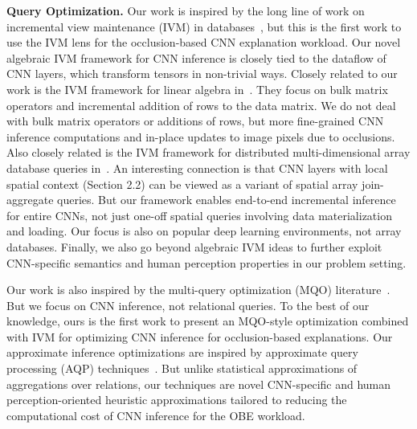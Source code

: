 \documentclass[10pt, sigconf]{acmart}
\begin{document}
\vspace{2mm}
\noindent \textbf{Query Optimization.}
Our work is inspired by the long line of work on incremental view maintenance (IVM) in databases~\cite{chirkova2012materialized, gupta1995maintenance, levy1995answering}, but this is the first work to use the IVM lens for the occlusion-based CNN explanation workload. Our novel algebraic IVM framework for CNN inference is closely tied to the dataflow of CNN layers, which transform tensors in non-trivial ways. Closely related to our work is the IVM framework for linear algebra in~\cite{nikolic2014linview}. They focus on bulk matrix operators and incremental addition of rows to the data matrix. We do not deal with bulk matrix operators or additions of rows, but more fine-grained CNN inference computations and in-place updates to image pixels due to occlusions. Also closely related is the IVM framework for distributed multi-dimensional array database queries in~\cite{zhao2017incremental}. An interesting connection is that CNN layers with local spatial context (Section 2.2) can be viewed as a variant of spatial array join-aggregate queries. But our framework enables end-to-end incremental inference for entire CNNs, not just one-off spatial queries involving data materialization and loading. Our focus is also on popular deep learning environments, not array databases. Finally, we also go beyond algebraic IVM ideas to further exploit CNN-specific semantics and human perception properties in our problem setting.

Our work is also inspired by the multi-query optimization (MQO) literature~\cite{sellis1988multiple,le2012scalable}. But we focus on CNN inference, not relational queries. To the best of our knowledge, ours is the first work to present an MQO-style optimization combined with IVM for optimizing CNN inference for occlusion-based explanations.
Our approximate inference optimizations are inspired by approximate query processing (AQP) techniques~\cite{park2018verdictdb,garofalakis2001approximate}. But unlike statistical approximations of aggregations over relations, our techniques are novel CNN-specific and human perception-oriented heuristic approximations tailored to reducing the computational cost of CNN inference for the OBE workload.
\end{document}
